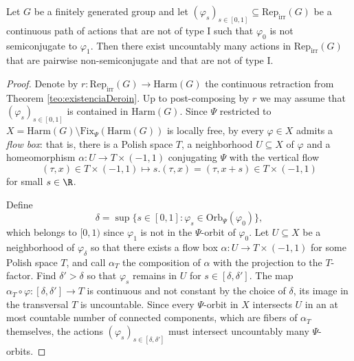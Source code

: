 \documentclass[reqno]{amsart}
\begin{document}
\begin{lema} \label{lema:BS}
    Let $G$ be a finitely generated group and let $(\varphi_s)_{s \in [0,1]} \subseteq \mathrm{Rep}_\mathrm{irr}(G)$ be a continuous path of actions that are not of type I such that $\varphi_0$ is not semiconjugate to $\varphi_1$. Then there exist uncountably many actions in $\mathrm{Rep}_\mathrm{irr}(G)$ that are pairwise non-semiconjugate and that are not of type I. 
\end{lema}
\begin{proof}
Denote by $r \colon \mathrm{Rep}_\mathrm{irr}(G) \to \mathrm{Harm}(G)$  the continuous retraction from Theorem \ref{teo:existenciaDeroin}. Up to post-composing by $r$ we may assume that $(\varphi_s)_{s \in [0,1]}$ is contained in $\mathrm{Harm}(G)$. Since $\Psi$ restricted to $X = \mathrm{Harm}(G) \setminus \mathrm{Fix}_\Psi(\mathrm{Harm}(G))$ is locally free, by \cite[Lemma 5.1]{deroinHurtado} every $\varphi \in X$ admits a \emph{flow box}: that is, there is a Polish space $T$, a neighborhood $U \subseteq X$ of $\varphi$ and a homeomorphism $\alpha \colon U \to T \times (-1, 1)$ conjugating $\Psi$ with the vertical flow
\[
    (\tau, x) \in T \times (-1, 1) \mapsto s.(\tau, x) = (\tau, x+s) \in T \times (-1,1)
\]
for small $s \in \R$.

Define
\[
    \delta = \sup\{s \in [0,1] : \varphi_s \in \mathrm{Orb}_\Psi(\varphi_0)\},
\]
which belongs to $[0,1)$ since $\varphi_1$ is not in the $\Psi$-orbit of $\varphi_0$. 
Let $U \subseteq X$ be a neighborhood of $\varphi_\delta$ so that there exists a flow box $\alpha \colon U \to T \times (-1,1)$ for some Polish space $T$, and call $\alpha_T$ the composition of $\alpha$ with the projection to the $T$-factor. Find $\delta' > \delta$ so that $\varphi_s$ remains in $U$ for $s \in [\delta, \delta']$. The map $\alpha_T \circ \varphi \colon [\delta, \delta'] \to T$ is continuous and not constant by the choice of $\delta$, its image in the transversal $T$ is uncountable. Since every $\Psi$-orbit in $X$ intersects $U$ in an at most countable number of connected components, which are fibers of $\alpha_T$ themselves, the actions $(\varphi_s)_{s \in [\delta, \delta']}$ must intersect uncountably many $\Psi$-orbits.
\end{proof}
\end{document}
